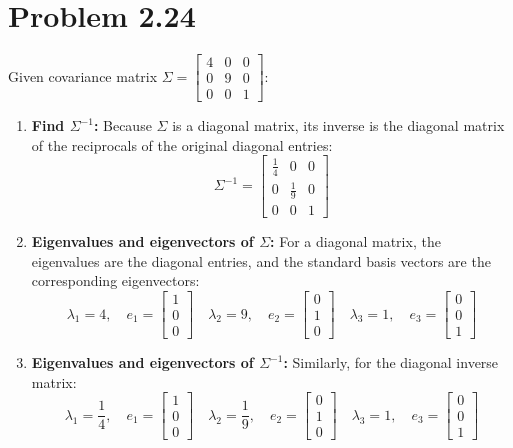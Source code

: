 \documentclass[11pt,letterpaper]{article}
\begin{document}
\section*{Problem 2.24}
Given covariance matrix $\Sigma = \begin{bmatrix} 4 & 0 & 0 \\ 0 & 9 & 0 \\ 0 & 0 & 1 \end{bmatrix}$:
\begin{enumerate}
    \item[(a)] \textbf{Find $\Sigma^{-1}$:} 
    Because $\Sigma$ is a diagonal matrix, its inverse is the diagonal matrix of the reciprocals of the original diagonal entries:
    $$\Sigma^{-1} = \begin{bmatrix} \frac{1}{4} & 0 & 0 \\ 0 & \frac{1}{9} & 0 \\ 0 & 0 & 1 \end{bmatrix}$$
    
    \item[(b)] \textbf{Eigenvalues and eigenvectors of $\Sigma$:} 
    For a diagonal matrix, the eigenvalues are the diagonal entries, and the standard basis vectors are the corresponding eigenvectors:
    $$\lambda_1 = 4, \quad e_1 = \begin{bmatrix} 1 \\ 0 \\ 0 \end{bmatrix} \quad \lambda_2 = 9, \quad e_2 = \begin{bmatrix} 0 \\ 1 \\ 0 \end{bmatrix} \quad \lambda_3 = 1, \quad e_3 = \begin{bmatrix} 0 \\ 0 \\ 1 \end{bmatrix}$$
    
    \item[(c)] \textbf{Eigenvalues and eigenvectors of $\Sigma^{-1}$:} 
    Similarly, for the diagonal inverse matrix:
    $$\lambda_1 = \frac{1}{4}, \quad e_1 = \begin{bmatrix} 1 \\ 0 \\ 0 \end{bmatrix} \quad \lambda_2 = \frac{1}{9}, \quad e_2 = \begin{bmatrix} 0 \\ 1 \\ 0 \end{bmatrix} \quad \lambda_3 = 1, \quad e_3 = \begin{bmatrix} 0 \\ 0 \\ 1 \end{bmatrix}$$
\end{enumerate}
\end{document}
